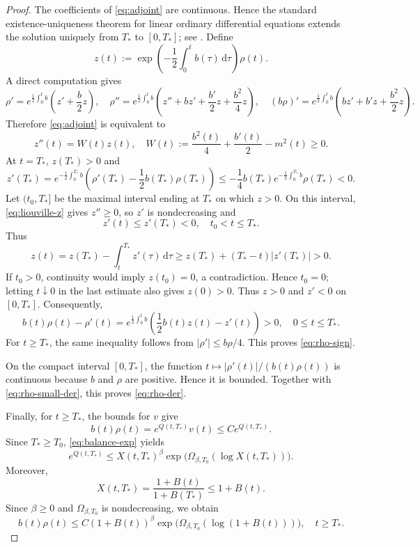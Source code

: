 \documentclass[11pt,reqno]{amsart}
\theoremstyle{definition}
\theoremstyle{remark}
\begin{document}
\begin{proof}
		The coefficients of \eqref{eq:adjoint} are continuous. Hence the standard existence-uniqueness theorem for linear ordinary differential equations extends the solution uniquely from $T_*$ to $[0,T_*]$; see \cite[Chapter 1]{CoddingtonLevinson1955}. Define
		$$
		z(t):=\exp\left(-\frac12\int_0^t b(\tau)\,\mathrm{d}\tau\right)\rho(t).
		$$
		A direct computation gives
		$$
		\rho'=e^{\frac12\int_0^t b}\left(z'+\frac{b}{2}z\right), \quad
		\rho''=e^{\frac12\int_0^t b}
		\left(z''+bz'+\frac{b'}2z+\frac{b^2}{4}z\right), \quad (b\rho)'=e^{\frac12\int_0^t b}
		\left(bz'+b'z+\frac{b^2}{2}z\right).
		$$
		Therefore \eqref{eq:adjoint} is equivalent to
		\begin{equation}
			\label{eq:liouville-z}
			z''(t)=W(t)z(t),
			\quad
			W(t):=\frac{b^2(t)}4+\frac{b'(t)}2-m^2(t)\geq0.
		\end{equation}
		At $t=T_*$, $z(T_*)>0$ and
		$$
		z'(T_*)
		=e^{-\frac12\int_0^{T_*}b}
		\left(\rho'(T_*)-\frac12b(T_*)\rho(T_*)\right)
		\leq-\frac14b(T_*)e^{-\frac12\int_0^{T_*}b}\rho(T_*)<0.
		$$
		Let $(t_0,T_*]$ be the maximal interval ending at $T_*$ on which $z>0$. On this interval, \eqref{eq:liouville-z} gives $z''\geq0$, so $z'$ is nondecreasing and
		$$
		z'(t)\leq z'(T_*)<0,
		\quad t_0<t\leq T_*.
		$$
		Thus
		$$
		z(t)=z(T_*)-\int_t^{T_*}z'(\tau)\,\mathrm{d}\tau
		\geq z(T_*)+(T_*-t)|z'(T_*)|>0.
		$$
		If $t_0>0$, continuity would imply $z(t_0)=0$, a contradiction. Hence $t_0=0$; letting $t\downarrow0$ in the last estimate also gives $z(0)>0$. Thus $z>0$ and $z'<0$ on $[0,T_*]$. Consequently,
		$$
		b(t)\rho(t)-\rho'(t)
		=e^{\frac12\int_0^t b}
		\left(\frac12b(t)z(t)-z'(t)\right)>0,
		\quad 0\leq t\leq T_*.
		$$
		For $t\geq T_*$, the same inequality follows from $|\rho'|\leq b\rho/4$. This proves \eqref{eq:rho-sign}.
		
		On the compact interval $[0,T_*]$, the function $t\longmapsto |\rho'(t)|/(b(t)\rho(t))$ is continuous because $b$ and $\rho$ are positive. Hence it is bounded. Together with \eqref{eq:rho-small-der}, this proves \eqref{eq:rho-der}.
		
		Finally, for $t\geq T_*$, the bounds for $v$ give
		$$
		b(t)\rho(t)
		=
		e^{Q(t,T_*)}v(t)
		\leq C e^{Q(t,T_*)}.
		$$
		Since $T_*\geq T_0$, \eqref{eq:balance-exp} yields
		$$
		e^{Q(t,T_*)}
		\leq
		X(t,T_*)^\beta
		\exp\bigl(
		\Omega_{\beta,T_0}(\log X(t,T_*))
		\bigr).
		$$
		Moreover,
		$$
		X(t,T_*)
		=
		\frac{1+B(t)}{1+B(T_*)}
		\leq1+B(t).
		$$
		Since $\beta\geq0$ and $\Omega_{\beta,T_0}$ is nondecreasing, we obtain
		$$
		b(t)\rho(t)
		\leq
		C(1+B(t))^\beta
		\exp\bigl(
		\Omega_{\beta,T_0}(\log(1+B(t)))
		\bigr),
		\quad t\geq T_*.
		$$
		

\end{proof}
\end{document}
